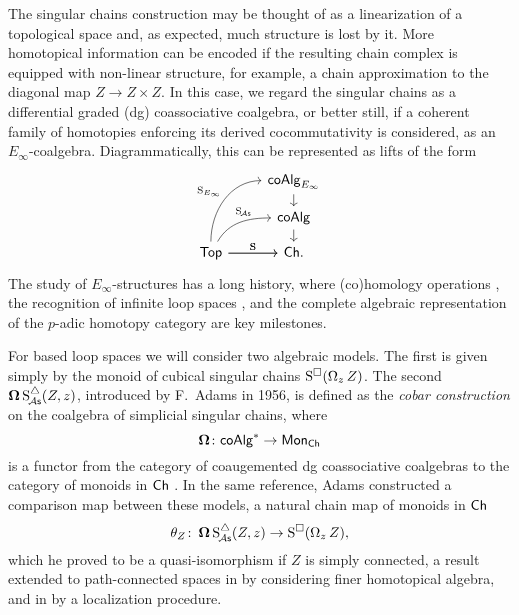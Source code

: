 The singular chains construction may be thought of as a linearization of a topological space and, as expected, much structure is lost by it.
More homotopical information can be encoded if the resulting chain complex is equipped with non-linear structure, for example, a chain approximation to the diagonal map $Z \to Z \times Z$.
In this case, we regard the singular chains as a differential graded (dg) coassociative coalgebra, or better still, if a coherent family of homotopies enforcing its derived cocommutativity is considered, as an $E_\infty$-coalgebra.
Diagrammatically, this can be represented as lifts of the form
\begin{equation}
\begin{tikzcd}[column sep=normal, row sep=small]
& \coAlg_{E_\infty} \arrow[d] \\
& \coAlg \arrow[d] \\
\Top \arrow[uur, "\Schains_{E_\infty}", out=90, in=180] \arrow[r, "\Schains"]
\arrow[ur, "\SchainsAS", out=60, in=180, near end]
\arrow[r, "\Schains"]
& \Ch.
\end{tikzcd}
\end{equation}
The study of $E_\infty$-structures has a long history, where (co)homology operations \cite{steenrod1962cohomology, may1970general}, the recognition of infinite loop spaces \cite{boardman1973homotopy, may1972geometry}, and the complete algebraic representation of the $p$-adic homotopy category \cite{mandell2001padic} are key milestones.

For based loop spaces we will consider two algebraic models.
The first is given simply by the monoid of cubical singular chains $\operatorname{S^{\square}}(\operatorname{\Omega}_z Z)$.
The second $\operatorname{\mathbf{\Omega}} \operatorname{S^{\triangle}_{\!{\mathcal{A}\mathsf{s}}}}(Z,z)$, introduced by F.~Adams in 1956, is defined as the \textit{cobar construction} on the coalgebra of simplicial singular chains, where
\[
\operatorname{\mathbf{\Omega}} \colon \mathsf{coAlg}^\ast \to \mathsf{Mon}_{\mathsf{Ch}}
\]
is a functor from the category of coaugemented dg coassociative coalgebras to the category of monoids in $\mathsf{Ch}$ \cite{adams1956cobar}.
In the same reference, Adams constructed a comparison map between these models, a natural chain map of monoids in $\mathsf{Ch}$
\begin{equation} \label{e:adams map}
\theta_Z \colon \operatorname{\mathbf{\Omega}} \operatorname{S^{\triangle}_{\!{\mathcal{A}\mathsf{s}}}}(Z,z) \to \operatorname{S^{\square}}(\operatorname{\Omega}_z Z),
\end{equation}
which he proved to be a quasi-isomorphism if $Z$ is simply connected, a result extended to path-connected spaces in \cite{rivera2018cubical} by considering finer homotopical algebra, and in \cite{hess2010cobar} by a localization procedure.

